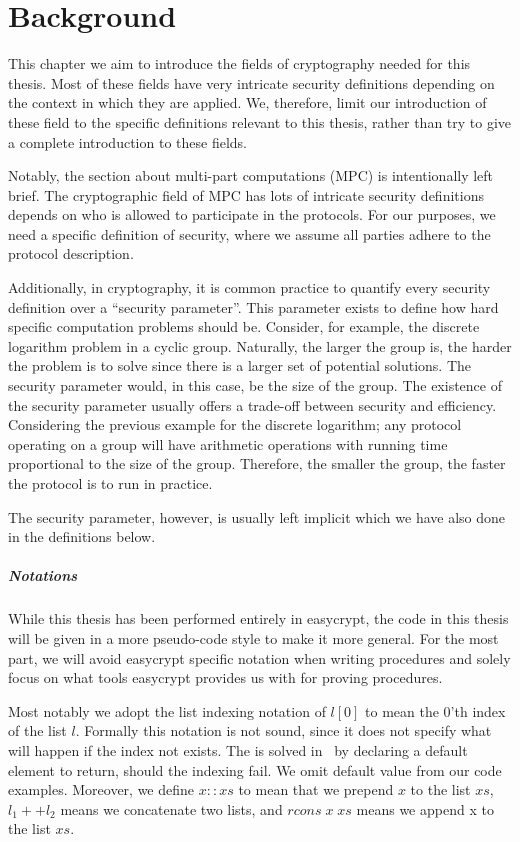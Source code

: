\chapter{Background}
\label{ch:background}
This chapter we aim to introduce the fields of cryptography needed for this
thesis.
Most of these fields have very intricate security definitions depending on the
context in which they are applied.
We, therefore, limit our introduction of these field to the specific definitions
relevant to this thesis, rather than try to give a complete introduction to these fields.

Notably, the section about multi-part computations (MPC) is intentionally left brief. The
cryptographic field of MPC has lots of intricate security definitions
depends on who is allowed to participate in the protocols. For our purposes, we
need a specific definition of security, where we assume all parties
adhere to the protocol description.

Additionally, in cryptography, it is common practice to quantify every security
definition over a ``security parameter''. This parameter exists to define how
hard specific computation problems should be. Consider, for example, the discrete
logarithm problem in a cyclic group. Naturally, the larger the group is,
the harder the problem is to solve since there is a larger set of potential solutions. The
security parameter would, in this case, be the size of the group.
The existence of the security parameter usually offers a trade-off between
security and efficiency. Considering the previous example for the discrete
logarithm; any protocol operating on a group will have arithmetic operations
with running time proportional to the size of the group. Therefore, the smaller
the group, the faster the protocol is to run in practice.

The security parameter, however, is usually left implicit which we have also
done in the definitions below.

\paragraph{Notations}
While this thesis has been performed entirely in easycrypt, the code in this
thesis will be given in a more pseudo-code style to make it more general. For
the most part, we will avoid easycrypt specific notation when writing procedures
and solely focus on what tools easycrypt provides us with for proving
procedures.

Most notably we adopt the list indexing notation of $l[0]$ to mean the 0'th
index of the list $l$. Formally this notation is not sound, since it does not
specify what will happen if the index not exists. The is solved in \easycrypt\
by declaring a default element to return, should the indexing fail. We omit 
default value from our code examples.
Moreover, we define $x::xs$ to mean that we prepend $x$ to the list $xs$,
$l_{1} ++ l_{2}$ means we concatenate two lists, and $rcons \; x \; xs$ means we
append x to the list $xs$.

